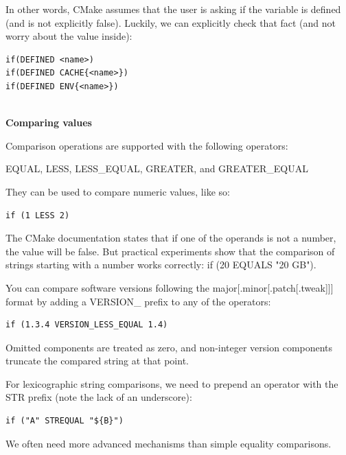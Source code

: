 In other words, CMake assumes that the user is asking if the variable is defined (and is not explicitly false). Luckily, we can explicitly check that fact (and not worry about the value inside):

\begin{lstlisting}[style=styleCMake]
if(DEFINED <name>)
if(DEFINED CACHE{<name>})
if(DEFINED ENV{<name>})
\end{lstlisting}

\hspace*{\fill} \\ %
\noindent
\textbf{Comparing values}

Comparison operations are supported with the following operators:

EQUAL, LESS, LESS\_EQUAL, GREATER, and GREATER\_EQUAL

They can be used to compare numeric values, like so:

\begin{lstlisting}[style=styleCMake]
if (1 LESS 2)
\end{lstlisting}

\begin{tcolorbox}[colback=blue!5!white,colframe=blue!75!black,title=Note]
The CMake documentation states that if one of the operands is not a number, the value will be false. But practical experiments show that the comparison of strings starting with a number works correctly: if (20 EQUALS "20 GB").
\end{tcolorbox}

You can compare software versions following the major[.minor[.patch[.tweak]]] format by adding a VERSION\_ prefix to any of the operators:

\begin{lstlisting}[style=styleCMake]
if (1.3.4 VERSION_LESS_EQUAL 1.4)
\end{lstlisting}

Omitted components are treated as zero, and non-integer version components truncate the compared string at that point.

For lexicographic string comparisons, we need to prepend an operator with the STR prefix (note the lack of an underscore):

\begin{lstlisting}[style=styleCMake]
if ("A" STREQUAL "${B}")
\end{lstlisting}

We often need more advanced mechanisms than simple equality comparisons.

